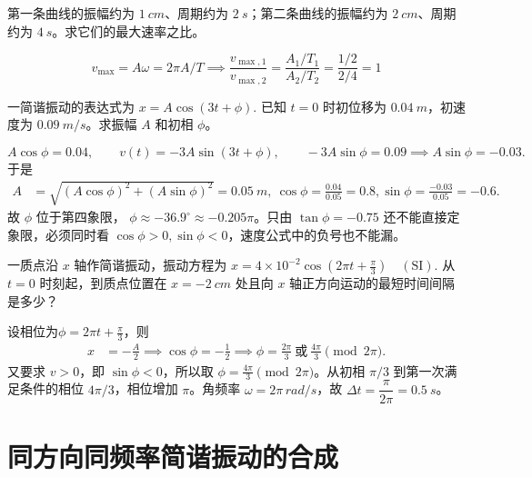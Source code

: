 \documentclass[lang=cn,11pt]{elegantbook}
\begin{document}
\begin{exercise}[由振动曲线判断最大速率比]
第一条曲线的振幅约为 \(\SI{1}{cm}\)、周期约为 \(\SI{2}{s}\)；第二条曲线的振幅约为 \(\SI{2}{cm}\)、周期约为 \(\SI{4}{s}\)。求它们的最大速率之比。
\end{exercise}
\begin{solution}
\[v_{\max}=A\omega=2\pi A/T\implies\dfrac{v_{\max,1}}{v_{\max,2}}
=\dfrac{A_1/T_1}{A_2/T_2}
=\dfrac{1/2}{2/4}=1\]
\end{solution}

\begin{exercise}
一简谐振动的表达式为
 \(x=A\cos(3t+\phi).\) 
已知 \(t=0\) 时初位移为 \(\SI{0.04}{m}\)，初速度为 \(\SI{0.09}{m/s}\)。求振幅 \(A\) 和初相 \(\phi\)。
\end{exercise}
\begin{solution}
 \[A\cos\phi=0.04,\qquad v(t)=-3A\sin(3t+\phi),\qquad -3A\sin\phi=0.09 \implies A\sin\phi=-0.03.\] 
于是
\[
\begin{aligned}
A&=\sqrt{(A\cos\phi)^2+(A\sin\phi)^2}=\SI{0.05}{m},~\cos\phi=\frac{0.04}{0.05}=0.8,\sin\phi=\frac{-0.03}{0.05}=-0.6.
\end{aligned}
\]
故 \(\phi\) 位于第四象限，
\(\phi\approx -36.9^\circ\approx -0.205\pi\)。只由 \(\tan\phi=-0.75\) 还不能直接定象限，必须同时看 \(\cos\phi>0,\sin\phi<0\)，速度公式中的负号也不能漏。
\end{solution}

\begin{exercise}
一质点沿 \(x\) 轴作简谐振动，振动方程为
 \(x=4\times10^{-2}\cos\left(2\pi t+\frac{\pi}{3}\right)\quad(\mathrm{SI}).\) 
从 \(t=0\) 时刻起，到质点位置在 \(x=-\SI{2}{cm}\) 处且向 \(x\) 轴正方向运动的最短时间间隔是多少？
\end{exercise}
\begin{solution}
设相位为$\phi=2\pi t+\frac{\pi}{3}$，则
\[
\begin{aligned}
x&=-\frac{A}{2}\implies
\cos\phi=-\frac12
\implies
\phi=\frac{2\pi}{3}\ \text{或}\ \frac{4\pi}{3}\pmod{2\pi}.
\end{aligned}
\]
又要求 \(v>0\)，即 \(\sin\phi<0\)，所以取 \(\phi=\frac{4\pi}{3}\pmod{2\pi}\)。从初相 \(\pi/3\) 到第一次满足条件的相位 \(4\pi/3\)，相位增加 \(\pi\)。角频率 \(\omega=2\pi\,\si{rad/s}\)，故 \(\Delta t=\dfrac{\pi}{2\pi}=\SI{0.5}{s}\)。
\end{solution}

\section{同方向同频率简谐振动的合成}
\end{document}
